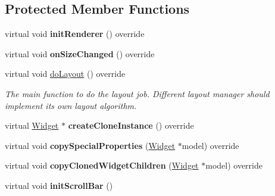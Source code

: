 \subsection*{Protected Member Functions}
\begin{DoxyCompactItemize}
\item 
\mbox{\label{classui_1_1ScrollView_ac8820614c6c3d3229726fb3b8a30669d}} 
virtual void {\bfseries init\+Renderer} () override
\item 
\mbox{\label{classui_1_1ScrollView_a9e85df097119f0bad02216d5276d2f73}} 
virtual void {\bfseries on\+Size\+Changed} () override
\item 
\mbox{\label{classui_1_1ScrollView_a798578c149ccf6cab8c7a7131a41052d}} 
virtual void \hyperlink{classui_1_1ScrollView_a798578c149ccf6cab8c7a7131a41052d}{do\+Layout} () override
\begin{DoxyCompactList}\small\item\em The main function to do the layout job. Different layout manager should implement its own layout algorithm. \end{DoxyCompactList}\item 
\mbox{\label{classui_1_1ScrollView_ae872efa34b9a49df936a3fe42972393f}} 
virtual \hyperlink{classui_1_1Widget}{Widget} $\ast$ {\bfseries create\+Clone\+Instance} () override
\item 
\mbox{\label{classui_1_1ScrollView_a63e4a30694bcad1e37d905c7b9897a9a}} 
virtual void {\bfseries copy\+Special\+Properties} (\hyperlink{classui_1_1Widget}{Widget} $\ast$model) override
\item 
\mbox{\label{classui_1_1ScrollView_a59eb6ce879234db43b01b7370b7c37c6}} 
virtual void {\bfseries copy\+Cloned\+Widget\+Children} (\hyperlink{classui_1_1Widget}{Widget} $\ast$model) override
\item 
\mbox{\label{classui_1_1ScrollView_abcdc3ec6505212f4a72836cd128da30c}} 
virtual void {\bfseries init\+Scroll\+Bar} ()
\item 
\mbox{\label{classui_1_1ScrollView_adb19d5e3a9a7c773c18865beed66da78}} 

\end{DoxyCompactItemize}
